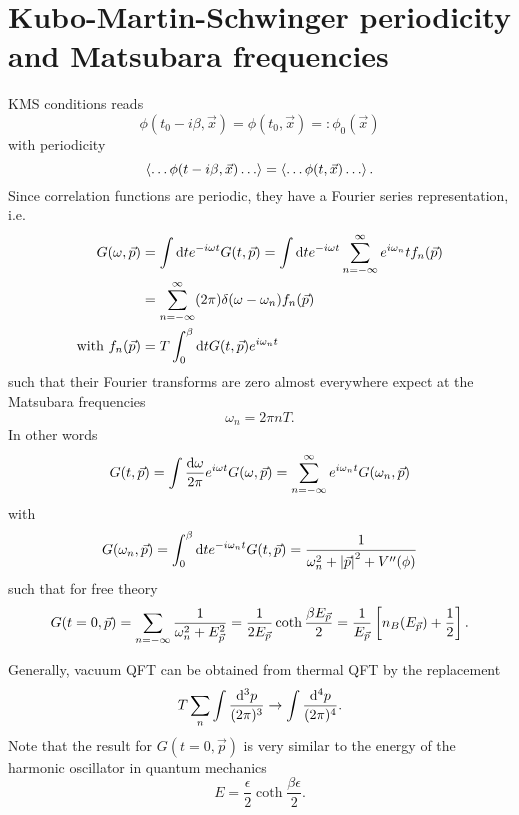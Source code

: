 \section{Kubo-Martin-Schwinger periodicity and Matsubara frequencies}
\begin{mybox}{}
	KMS conditions reads
	\begin{equation}
		\phi(t_0-i\beta,\vec{x})=\phi(t_0,\vec{x})=: \phi_0(\vec{x})
	\end{equation}
with periodicity
\begin{equation}
	\expval{\dots \phi(t-i\beta,\vec{x})\dots  } = \expval{\dots \phi(t,\vec{x}) \dots}.
\end{equation}
Since correlation functions are periodic, they have a Fourier series representation, i.e.
\begin{align}
G(\omega,\vec{p}) &= \int \mathrm{d} t e^{-i \omega t} G(t,\vec{p}) = \int \mathrm{d} t e^{-i \omega t} \sum_{n=-\infty}^{\infty} e^{i \omega_n} t f_n(\vec{p}) \\
&= \sum_{n=-\infty}^\infty (2 \pi) \delta(\omega-\omega_n) f_n(\vec{p}) \nonumber \\
\text{with   } f_n(\vec{p})&= T \int_0^\beta \mathrm{d} t G(t,\vec{p}) e^{i \omega_n t} 
\end{align}
such that their Fourier transforms are zero almost everywhere expect at the Matsubara frequencies 
\begin{equation}
	\omega_n = 2\pi n T.
\end{equation}
In other words
\begin{equation}
	G(t,\vec{p}) = \int \frac{\mathrm{d} \omega}{2 \pi} e^{i \omega t} G(\omega,\vec{p}) = \sum_{n=-\infty}^\infty e^{i \omega_n t} G(\omega_n,\vec{p})
\end{equation}
with
\begin{equation}
	G(\omega_n,\vec{p}) = \int_0^\beta \mathrm{d} t e^{-i \omega_n t} G(t,\vec{p}) = \frac{1}{\omega^2_n+\abs{\vec{p}}^2+V^{\prime \prime}(\phi)}
\end{equation}
such that for free theory
\begin{equation}
	G(t=0,\vec{p}) = \sum_{n=-\infty} \frac{1}{\omega^2_n+E^2_{\vec{p}}} = \frac{1}{2E_{\vec{p}}} \coth \frac{\beta E_{\vec{p}}}{2} = \frac{1}{E_{\vec{p}}} \left[n_B(E_{\vec{p}}) + \frac{1}{2}\right].
\end{equation}
\end{mybox}
Generally, vacuum QFT can be obtained from thermal QFT by the replacement
\begin{equation}
	T\sum_n \int \frac{\mathrm{d}^3 p}{(2 \pi)^3} \rightarrow \int \frac{\mathrm{d}^4p}{(2 \pi)^4}.
\end{equation}
Note that the result for $G(t=0,\vec{p})$ is very similar to the energy of the harmonic oscillator in quantum mechanics
\begin{equation}
E = \frac{\epsilon}{2} \coth \frac{\beta \epsilon}{2}.
\end{equation}
